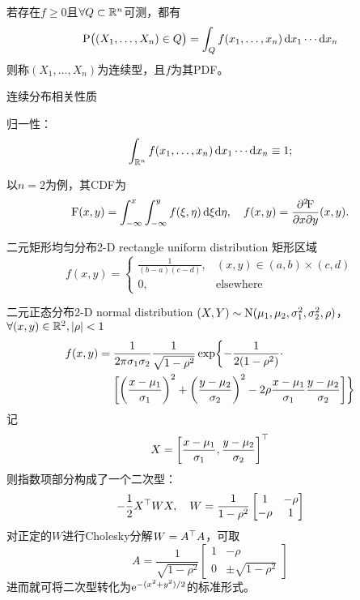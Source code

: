 若存在$f\geqslant 0$且$\forall Q\subset\mathbb R^n$可测，都有
\[
	\operatorname{P}\bigl((X_1,\ldots,X_n)\in Q\bigr)=\int_Qf(x_1,\ldots,x_n)\mathop{}\!\mathrm{d} x_1\cdots\mathop{}\!\mathrm{d} x_n
\]
则称$(X_1,\ldots,X_n)$为连续型，且$f$为其PDF。
\begin{theorem}{连续分布相关性质}{}
	\begin{compactenum}
		\item 归一性：
		\[
			\int_{\mathbb R^n}f(x_1,\ldots,x_n)\mathop{}\!\mathrm{d} x_1\cdots\mathop{}\!\mathrm{d} x_n\equiv 1;
		\]
		\item 以$n=2$为例，其CDF为
		\[
			\operatorname{F}(x,y)=\int_{-\infty}^x\int_{-\infty}^yf(\xi,\eta)\mathop{}\!\mathrm{d}\xi\mathrm{d}\eta,\quad f(x,y)=\frac{\partial^2{\!\operatorname{F}}}{\partial{x}\partial{y}}(x,y).
		\]
	\end{compactenum}
\end{theorem}
\begin{example}{二元矩形均匀分布}{2-D rectangle uniform distribution}
	矩形区域
	\[
		f(x,y)=\begin{cases}
			\frac1{(b-a)(c-d)},&(x,y)\in(a,b)\times(c,d)\\
			0,&\text{elsewhere}
		\end{cases}
	\]
\end{example}
\begin{example}{二元正态分布}{2-D normal distribution}
	$(X,Y)\sim\operatorname{N}(\mu_1,\mu_2,\sigma_1^2,\sigma_2^2,\rho)$，$\forall(x,y)\in\mathbb R^2,\left\lvert\rho\right\rvert<1$
	\begin{align}
		\begin{aligned}
			f(x,y)={}&\frac1{2\pi\sigma_1\sigma_2}\frac1{\sqrt{1-\rho^2}}\exp\biggl\{-\frac1{2(1-\rho^2)}\cdot\\
			&\biggl[\biggl(\frac{x-\mu_1}{\sigma_1}\biggr)^2+\biggl(\frac{y-\mu_2}{\sigma_2}\biggr)^2-2\rho\frac{x-\mu_1}{\sigma_1}\frac{y-\mu_2}{\sigma_2}\biggr]\biggr\}
		\end{aligned}
	\end{align}
	\tcblower
	记
	\[
		X=\left[\frac{x-\mu_1}{\sigma_1},\frac{y-\mu_2}{\sigma_2}\right]^\top
	\]
	则指数项部分构成了一个二次型：
	\[
		-\frac12X^\top WX,\quad W=\frac1{1-\rho^2}\begin{bmatrix}
			1&-\rho\\-\rho&1
		\end{bmatrix}
	\]
	对正定的$W$进行Cholesky分解$W=A^\top A$，可取
	\[
		A=\frac1{\sqrt{1-\rho^2}}\begin{bmatrix}
			1&-\rho\\0&\pm\sqrt{1-\rho^2}
		\end{bmatrix}
	\]
	进而就可将二次型转化为$\mathop{}\!\mathrm{e}^{-(x^2+y^2)/2}$的标准形式。
\end{example}

